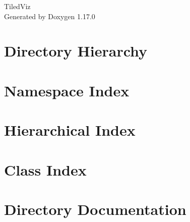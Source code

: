 \documentclass[twoside]{book}
\newcommand{\+}{\discretionary{\mbox{\scriptsize$\hookleftarrow$}}{}{}}
\newcommand{\clearemptydoublepage}{%
    \newpage{\pagestyle{empty}\cleardoublepage}%
  }
\begin{document}
  \raggedbottom
    \hypersetup{pageanchor=false,
                bookmarksnumbered=true,
                pdfencoding=unicode
               }
  \begin{titlepage}
  \vspace*{7cm}
  \begin{center}%
  {\Large Tiled\+Viz}\\
  \vspace*{1cm}
  {\large Generated by Doxygen 1.17.0}\\
  \end{center}
  \end{titlepage}
  \clearemptydoublepage
  \tableofcontents
  \clearemptydoublepage
  \hypersetup{pageanchor=true}








\chapter{Directory Hierarchy}

\chapter{Namespace Index}

\chapter{Hierarchical Index}

\chapter{Class Index}

\chapter{Directory Documentation}







\end{document}
